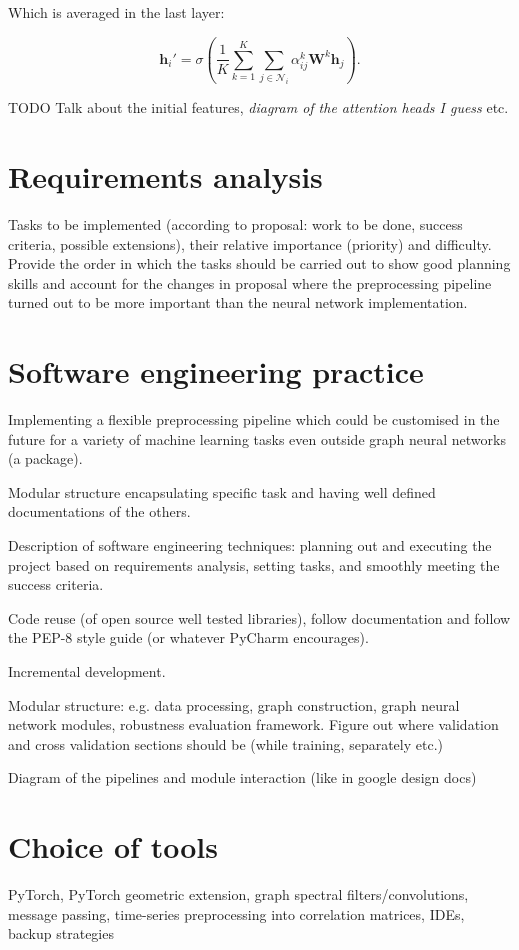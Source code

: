 Which is averaged in the last layer:

\begin{equation}
    \mathbf{h}_i' = \sigma(\frac{1}{K}\sum\limits_{k=1}^K\sum\limits_{j \in \mathcal{N}_i} \alpha_{ij}^k\mathbf{W}^k\mathbf{h}_j).
\end{equation}

TODO Talk about the initial features, \textit{diagram of the attention heads I guess} etc.


\section{Requirements analysis}

Tasks to be implemented (according to proposal: work to be done, success criteria, possible extensions), their relative importance (priority) and difficulty. Provide the order in which the tasks should be carried out to show good planning skills and account for the changes in proposal where the preprocessing pipeline turned out to be more important than the neural network implementation.

\section{Software engineering practice}
Implementing a flexible preprocessing pipeline which could be customised in the future for a variety of machine learning tasks even outside graph neural networks (a package).

Modular structure encapsulating specific task and having well defined documentations of the others.

Description of software engineering techniques: planning out and executing the project based on requirements analysis, setting tasks, and smoothly meeting the success criteria.

Code reuse (of open source well tested libraries), follow documentation and follow the PEP-8 style guide (or whatever PyCharm encourages).

Incremental development.

Modular structure: e.g. data processing, graph construction, graph neural network modules, robustness evaluation framework. Figure out where validation and cross validation sections should be (while training, separately etc.)

Diagram of the pipelines and module interaction (like in google design docs)


\section{Choice of tools}
PyTorch, PyTorch geometric extension, graph spectral filters/convolutions, message passing, time-series preprocessing into correlation matrices, IDEs, backup strategies


